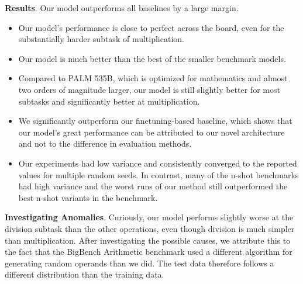\documentclass[11pt]{article}
\begin{document}
\textbf{Results}.
Our model outperforms all baselines by a large margin.
\begin{itemize}
    \item Our model's performance is close to perfect across the board, even for the substantially harder subtask of multiplication.
    \item Our model is much better than the best of the smaller benchmark models.
    \item Compared to PALM 535B, which is optimized for mathematics and almost two orders of magnitude larger, our model is still slightly better for most subtasks and significantly better at multiplication.
    \item We significantly outperform our finetuning-based baseline, which shows that our model's great performance can be attributed to our novel architecture and not to the difference in evaluation methods.
    \item Our experiments had low variance and consistently converged to the reported values for multiple random seeds. In contrast, many of the n-shot benchmarks had high variance and the worst runs of our method still outperformed the best n-shot variants in the benchmark.
\end{itemize}

\textbf{Investigating Anomalies}.
Curiously, our model performs slightly worse at the division subtask than the other operations, even though division is much simpler than multiplication. After investigating the possible causes, we attribute this to the fact that the BigBench Arithmetic benchmark used a different algorithm for generating random operands than we did. The test data therefore follows a different distribution than the training data.
\end{document}
